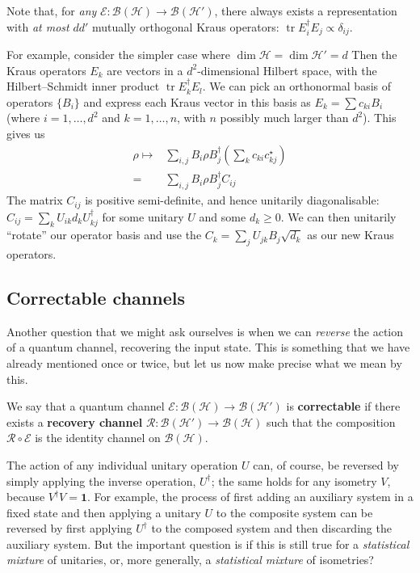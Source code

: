 \documentclass[fleqn]{article}
\newenvironment{idea}{\noindent}{\medskip}
\begin{document}
Note that, for \emph{any} \(\mathcal{E}\colon\mathcal{B}(\mathcal{H})\to\mathcal{B}(\mathcal{H}')\), there always exists a representation with \emph{at most} \(dd'\) mutually orthogonal Kraus operators: \(\operatorname{tr}E^\dagger_iE_j\propto\delta_{ij}\).

For example, consider the simpler case where \(\dim\mathcal{H}=\dim\mathcal{H}'=d\)
Then the Kraus operators \(E_k\) are vectors in a \(d^2\)-dimensional Hilbert space, with the Hilbert--Schmidt inner product \(\operatorname{tr}E^\dagger_k E_l\).
We can pick an orthonormal basis of operators \(\{B_i\}\) and express each Kraus vector in this basis as \(E_k=\sum c_{ki} B_i\) (where \(i=1,\ldots,d^2\) and \(k=1,\ldots,n\), with \(n\) possibly much larger than \(d^2\)).
This gives us
\[
  \begin{aligned}
    \rho
    \longmapsto
    & \sum_{i,j} B_i\rho B^\dagger_j \left(\sum _k c_{ki}c^\star_{kj}\right)
  \\=& \sum_{i,j} B_i\rho B^\dagger_j  C_{ij}
  \end{aligned}
\]
The matrix \(C_{ij}\) is positive semi-definite, and hence unitarily diagonalisable: \(C_{ij}=\sum_k U_{ik} d_k U^\dagger_{kj}\) for some unitary \(U\) and some \(d_k\geqslant 0\).
We can then unitarily ``rotate'' our operator basis and use the \(C_k=\sum_j U_{jk}B_j \sqrt{d_k}\) as our new Kraus operators.

\hypertarget{correctable-channels}{%
\subsection{Correctable channels}\label{correctable-channels}}

Another question that we might ask ourselves is when we can \emph{reverse} the action of a quantum channel, recovering the input state.
This is something that we have already mentioned once or twice, but let us now make precise what we mean by this.

\begin{idea}
We say that a quantum channel \(\mathcal{E}\colon\mathcal{B}(\mathcal{H})\to\mathcal{B}(\mathcal{H}')\) is \textbf{correctable} if there exists a \textbf{recovery channel} \(\mathcal{R}\colon\mathcal{B}(\mathcal{H}')\to\mathcal{B}(\mathcal{H})\) such that the composition \(\mathcal{R}\circ\mathcal{E}\) is the identity channel on \(\mathcal{B}(\mathcal{H})\).

\end{idea}

The action of any individual unitary operation \(U\) can, of course, be reversed by simply applying the inverse operation, \(U^\dagger\);
the same holds for any isometry \(V\), because \(V^\dagger V=\mathbf{1}\).
For example, the process of first adding an auxiliary system in a fixed state and then applying a unitary \(U\) to the composite system can be reversed by first applying \(U^\dagger\) to the composed system and then discarding the auxiliary system.
But the important question is if this is still true for a \emph{statistical mixture} of unitaries, or, more generally, a \emph{statistical mixture} of isometries?
\end{document}
